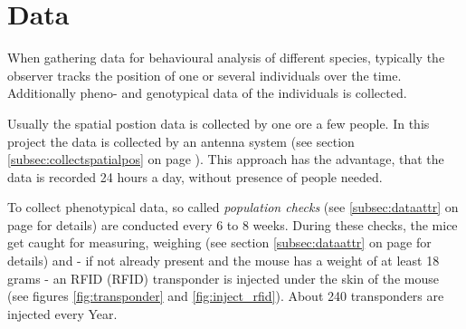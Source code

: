 \newpage
\section{Data}
\label{sec:datacollection}

When gathering data for behavioural analysis of different species, typically the observer tracks the position of one or several individuals over the time. Additionally pheno- and genotypical data of the individuals is collected.

Usually the spatial postion data is collected by one ore a few people. In this project the data is collected by an antenna system (see section \ref{subsec:collectspatialpos} on page \pageref{subsec:collectspatialpos}). This approach has the advantage, that the data is recorded 24 hours a day, without presence of people needed.

To collect phenotypical data, so called \textit{population checks} (see \ref{subsec:dataattr} on page \pageref{subsec:dataattr} for details) are conducted every 6 to 8 weeks. During these checks, the mice get caught for measuring, weighing (see section \ref{subsec:dataattr} on page \pageref{subsec:dataattr} for details) and - if not already present and the mouse has a weight of at least 18 grams - an \ac{RFID} (RFID) transponder is injected under the skin of the mouse (see figures \ref{fig:transponder} and \ref{fig:inject_rfid}). About 240 transponders are injected every Year.

